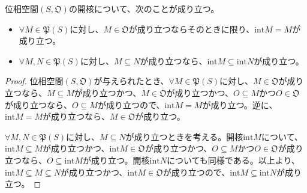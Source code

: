 \documentclass[dvipdfmx]{jsarticle}
\begin{document}
\begin{thm}\label{8.1.1.3}
位相空間$\left( S,\mathfrak{O} \right)$の開核について、次のことが成り立つ。
\begin{itemize}
\item
  $\forall M \in \mathfrak{P}(S)$に対し、$M \in \mathfrak{O}$が成り立つならそのときに限り、${\mathrm{int}}M = M$が成り立つ。
\item
  $\forall M,N \in \mathfrak{P}(S)$に対し、$M \subseteq N$が成り立つなら、${\mathrm{int}}M \subseteq {\mathrm{int}}N$が成り立つ。
\end{itemize}
\end{thm}
\begin{proof}
位相空間$\left( S,\mathfrak{O} \right)$が与えられたとき、$\forall M \in \mathfrak{P}(S)$に対し、$M \in \mathfrak{O}$が成り立つなら、$M \subseteq M$が成り立つかつ、$M \in \mathfrak{O}$が成り立つかつ、$O \subseteq M$かつ$O \in \mathfrak{O}$が成り立つなら、$O \subseteq M$が成り立つので、${\mathrm{int}}M = M$が成り立つ。逆に、${\mathrm{int}}M = M$が成り立つなら、$M \in \mathfrak{O}$が成り立つ。\par
$\forall M,N \in \mathfrak{P}(S)$に対し、$M \subseteq N$が成り立つときを考える。開核${\mathrm{int}}M$について、${\mathrm{int}}M \subseteq M$が成り立つかつ、${\mathrm{int}}M\in \mathfrak{O}$が成り立つかつ、$O \subseteq M$かつ$O \in \mathfrak{O}$が成り立つなら、$O \subseteq {\mathrm{int}}M$が成り立つ。開核${\mathrm{int}}N$についても同様である。以上より、${\mathrm{int}}M \subseteq M \subseteq N$が成り立つかつ、${\mathrm{int}}M\in \mathfrak{O}$が成り立つので、${\mathrm{int}}M \subseteq {\mathrm{int}}N$が成り立つ。
\end{proof}
\end{document}
